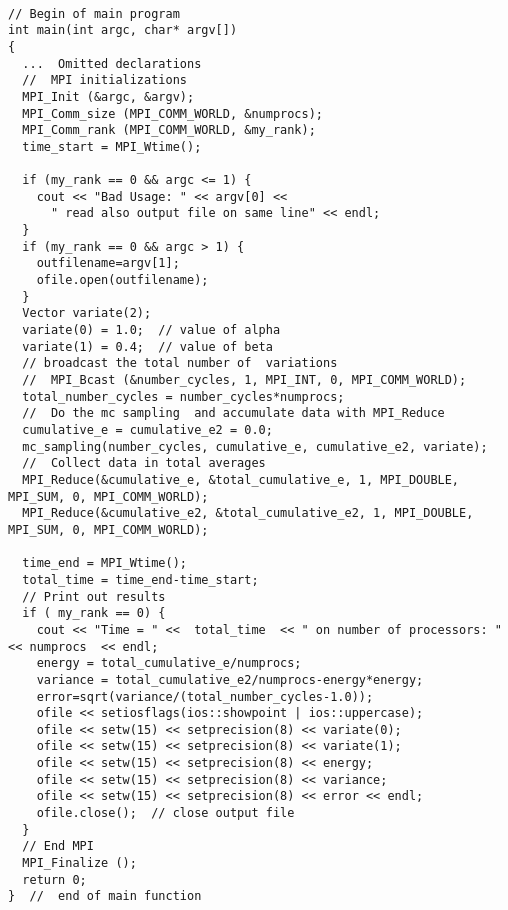 \documentclass[%
oneside,                 %
final,                   %
10pt]{article}
\begin{document}
\paragraph{}
\begin{verbatim}
// Begin of main program   
int main(int argc, char* argv[])
{
  ...  Omitted declarations
  //  MPI initializations
  MPI_Init (&argc, &argv);
  MPI_Comm_size (MPI_COMM_WORLD, &numprocs);
  MPI_Comm_rank (MPI_COMM_WORLD, &my_rank);
  time_start = MPI_Wtime();

  if (my_rank == 0 && argc <= 1) {
    cout << "Bad Usage: " << argv[0] << 
      " read also output file on same line" << endl;
  }
  if (my_rank == 0 && argc > 1) {
    outfilename=argv[1];
    ofile.open(outfilename); 
  }
  Vector variate(2);
  variate(0) = 1.0;  // value of alpha
  variate(1) = 0.4;  // value of beta
  // broadcast the total number of  variations
  //  MPI_Bcast (&number_cycles, 1, MPI_INT, 0, MPI_COMM_WORLD);
  total_number_cycles = number_cycles*numprocs; 
  //  Do the mc sampling  and accumulate data with MPI_Reduce
  cumulative_e = cumulative_e2 = 0.0;
  mc_sampling(number_cycles, cumulative_e, cumulative_e2, variate);
  //  Collect data in total averages
  MPI_Reduce(&cumulative_e, &total_cumulative_e, 1, MPI_DOUBLE, MPI_SUM, 0, MPI_COMM_WORLD);
  MPI_Reduce(&cumulative_e2, &total_cumulative_e2, 1, MPI_DOUBLE, MPI_SUM, 0, MPI_COMM_WORLD);

  time_end = MPI_Wtime();
  total_time = time_end-time_start;
  // Print out results  
  if ( my_rank == 0) {
    cout << "Time = " <<  total_time  << " on number of processors: "  << numprocs  << endl;
    energy = total_cumulative_e/numprocs;
    variance = total_cumulative_e2/numprocs-energy*energy;
    error=sqrt(variance/(total_number_cycles-1.0));
    ofile << setiosflags(ios::showpoint | ios::uppercase);
    ofile << setw(15) << setprecision(8) << variate(0);
    ofile << setw(15) << setprecision(8) << variate(1);
    ofile << setw(15) << setprecision(8) << energy;
    ofile << setw(15) << setprecision(8) << variance;
    ofile << setw(15) << setprecision(8) << error << endl;
    ofile.close();  // close output file
  }
  // End MPI
  MPI_Finalize ();  
  return 0;
}  //  end of main function
\end{verbatim}
\end{document}
